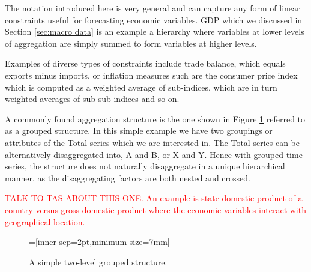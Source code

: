 \documentclass[graybox]{svmult}
\begin{document}
The notation introduced here is very general and can capture any form of linear constraints useful for forecasting economic variables. GDP which we discussed in Section \ref{sec:macro data} is an example a hierarchy where variables at lower levels of aggregation are simply summed to form variables at higher levels.

Examples of diverse types of constraints include trade balance, which equals exports minus imports, or inflation measures such are the consumer price index which is computed as a weighted average of sub-indices, which are in turn weighted averages of sub-sub-indices and so on. 

A commonly found aggregation structure is the one shown in Figure \ref{fig:simple grouped tree} referred to as a grouped structure. In this simple example we have two groupings or attributes of the Total series which we are interested in. The Total series can be alternatively disaggregated into, A and B, or X and Y. Hence with grouped time series, the structure does not naturally disaggregate in a unique hierarchical manner, as the disaggregating factors are both nested and crossed.

\textcolor{red}{TALK TO TAS ABOUT THIS ONE. An example is state domestic product of a country versus gross domestic product where the economic variables interact with geographical location.}

\begin{figure}[!hbt]
\center
{}=[inner sep=2pt,minimum size=7mm]
  \caption{A simple two-level grouped structure.}
  \label{fig:simple grouped tree}
\end{figure}
\end{document}
